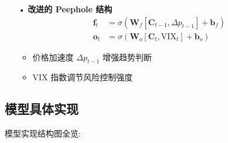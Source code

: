 \documentclass[a4paper,11pt]{ctexart}
\begin{document}
\begin{itemize}
  \item[•] \textbf{改进的 Peephole 结构}
  \begin{equation*}
  \begin{aligned}
  \mathbf{f}_t &= \sigma\left(\mathbf{W}_f[\mathbf{C}_{t-1}, \Delta p_{t-1}] + \mathbf{b}_f\right) \\
  \mathbf{o}_t &= \sigma\left(\mathbf{W}_o[\mathbf{C}_t, \text{VIX}_t] + \mathbf{b}_o\right)
  \end{aligned}
  \end{equation*}
  \begin{itemize}
    \item 价格加速度 $\Delta p_{t-1}$ 增强趋势判断
    \item VIX 指数调节风险控制强度
  \end{itemize}
\end{itemize}




\subsection{模型具体实现} 

模型实现结构图全览:
\end{document}

